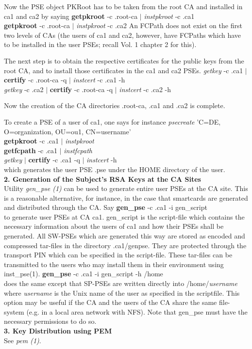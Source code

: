 Now the PSE object PKRoot has to be taken from the root CA and installed in ca1 and ca2 by saying
\bvtab
\1 {\bf getpkroot} -c .root-ca $|$ {\em instpkroot} -c .ca1 \\
\1 {\bf getpkroot} -c .root-ca $|$ {\em instpkroot} -c .ca2
\evtab
An FCPath does not exist on the first two levels of CAs (the users of ca1 and ca2, however,
have FCPaths which have to be installed in the user PSEs; recall Vol. 1 chapter 2 for this).
 
The next step is to obtain the
respective certificates for the public keys from the root CA, and to install those 
certificates in the ca1 and ca2 PSEs.
\bvtab
\1 {\em getkey} -c .ca1 $|$ {\bf certify} -c .root-ca -q $|$ {\em instcert} -c .ca1 -h \\
\1 {\em getkey} -c .ca2 $|$ {\bf certify} -c .root-ca -q $|$ {\em instcert} -c .ca2 -h \\
\evtab

Now the creation of the CA directories .root-ca, .ca1 and .ca2 is complete.
 
To create a PSE of a user of ca1, one says for instance
\bvtab
\1 {\em psecreate} 'C=DE, O=organization, OU=ou1, CN=username' \\
\1 {\bf getpkroot} -c .ca1 $|$ {\em instpkroot} \\
\1 {\bf getfcpath} -c .ca1 $|$ {\em instfcpath} \\
\1 {\em getkey} $|$ {\bf certify} -c .ca1 -q $|$ {\em instcert} -h \\
\evtab
which generates the user PSE .pse under the HOME directory of the user.
\\ [1em]
{\bf 2. Generation of the Subject's RSA Keys at the CA Sites}
\\ [1em]
Utility {\em gen\_pse (1)} can be used to generate entire user PSEs at the CA
site. This is a reasonable alternative, for instance, in the case that smartcards
are generated and distributed through the CA. Say
\bvtab
\1 {\bf gen\_pse} -c .ca1 -i gen\_script  \\
\evtab
to generate user PSEs at CA ca1. gen\_script is the script-file which contains
the necessary information about the users of ca1 and how their PSEs shall be generated.
All SW-PSEs which are generated this way are stored as encoded and compressed tar-files
in the directory .ca1/genpse. They are protected through the transport PIN which can
be specified in the script-file. These tar-files can be transmitted to the users
who may install them in their environment using inst\_pse(1).
\bvtab
\1 {\bf gen\_pse} -c .ca1 -i gen\_script -h /home \\
\evtab
does the same except that SP-PSEs are written directly into /home/{\em username}
where {\em username} is the Unix name of the user as specified in the scriptfile.
This option may be useful if the CA and the users of the CA share the same
file-system (e.g. in a local area network with NFS). Note that gen\_pse
must have the necessary permissions to do so.
\\ [1em]
{\bf 3. Key Distribution using PEM}
\\ [1em]
See {\em pem (1)}.
